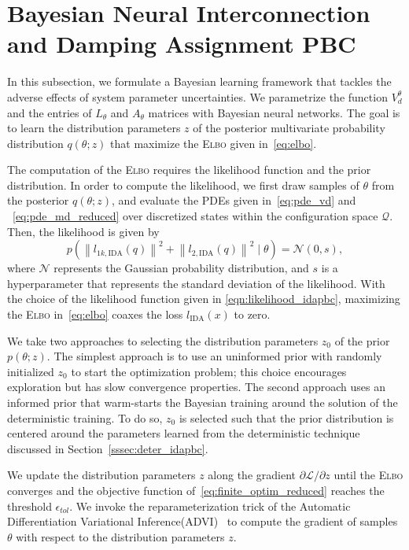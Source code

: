 
\section{Bayesian Neural Interconnection and Damping Assignment PBC}

In this subsection, we formulate a Bayesian learning framework that tackles the
adverse effects of system parameter uncertainties. 
%
We parametrize the function $V_d^\theta$ and the entries of $L_\theta$ and
$A_\theta$ matrices with Bayesian neural networks. 
%
The goal is to learn the distribution parameters $z$ of the posterior
multivariate probability distribution $q(\theta;z)$ that maximize the
\textsc{Elbo} given in~\eqref{eq:elbo}.
%


The computation of the \textsc{Elbo} requires the likelihood function and the
prior distribution.
%
In order to compute the likelihood, we first draw samples of $\theta$ from the
posterior $q(\theta;z)$, and evaluate the PDEs given in~\eqref{eq:pde_vd} and
~\eqref{eq:pde_md_reduced} over discretized states within the configuration
space $\mathcal{Q}$. Then, the likelihood is given by
\begin{equation}
    p(\left\| l_{1k,\textrm{IDA}}(q) \right\|^2 + \left\| l_{2,\textrm{IDA}}(q) \right\|^2 \mid \theta) = \mathcal{N}\left(0, s \right),
    \label{eqn:likelihood_idapbc}
\end{equation}
where $\mathcal{N}$ represents the Gaussian probability distribution, and $s$ is
a hyperparameter that represents the standard deviation of the likelihood.
%
With the choice of the likelihood function given in
\eqref{eqn:likelihood_idapbc}, maximizing the \textsc{Elbo}
in~\eqref{eq:elbo} coaxes the loss $l_{\text{IDA}}(x)$ to zero.


%
We take two approaches to selecting the distribution parameters $z_0$ of the
prior $p(\theta;z)$. The simplest approach is to use an uninformed prior with
randomly initialized $z_0$ to start the optimization problem; this choice
encourages exploration but has slow convergence properties. The second approach
uses an informed prior that warm-starts the Bayesian training around the
solution of the deterministic training. To do so, $z_0$ is selected such that
the prior distribution is centered around the parameters learned from the
deterministic technique discussed in Section~\ref{sssec:deter_idapbc}.


%
We update the distribution parameters $z$ along the gradient $\partial
\mathcal{L}/\partial z$ until the \textsc{Elbo} converges and the objective
function of~\eqref{eq:finite_optim_reduced} reaches the threshold
$\epsilon_{tol}$.
%
We invoke the reparameterization trick of the Automatic Differentiation
Variational Inference(\textsc{ADVI})~\cite{kucukelbir2015automatic} to compute
the gradient of samples $\theta$ with respect to the distribution parameters
$z$.


